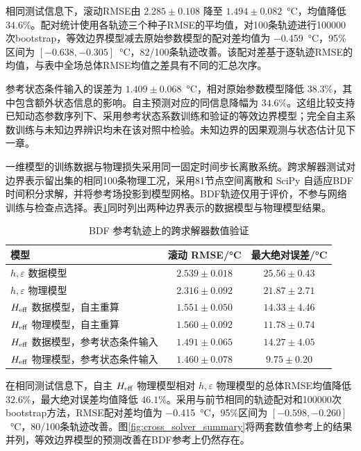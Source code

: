 相同测试信息下，滚动RMSE由 $2.285\pm0.108$ 降至 $1.494\pm0.082$~\si{\degreeCelsius}，均值降低 $34.6\%$。配对统计使用各轨迹三个种子RMSE的平均值，对100条轨迹进行100000次bootstrap，等效边界模型减去原始参数模型的配对差均值为 \SI{-0.459}{\degreeCelsius}，95\%区间为 $[-0.638,-0.305]$~\si{\degreeCelsius}，82/100条轨迹改善。该配对差基于逐轨迹RMSE的均值，与表中全场总体RMSE均值之差具有不同的汇总次序。

参考状态条件输入的误差为 $1.409\pm0.068$~\si{\degreeCelsius}，相对原始参数模型降低 $38.3\%$，其中包含额外状态信息的影响。自主预测对应的同信息降幅为 $34.6\%$。这组比较支持已知动态参数序列下、采用参考状态系数训练和验证的等效边界模型；完全自主系数训练与未知边界辨识均未在该对照中检验。未知边界的因果观测与状态估计见下一章。



一维模型的训练数据与物理损失采用同一固定时间步长离散系统。跨求解器测试对边界表示留出集的相同100条物理工况，采用81节点空间离散和 SciPy 自适应BDF时间积分求解，并将参考场投影到模型网格。BDF轨迹仅用于评价，不参与网络训练与检查点选择。表\ref{tab:cross_solver}同时列出两种边界表示的数据模型与物理模型结果。

\begin{table}[H]
  \centering
  \caption{BDF 参考轨迹上的跨求解器数值验证}
  \label{tab:cross_solver}
  \begin{tabular}{lcc}
    \toprule
    模型 & 滚动 RMSE/\si{\degreeCelsius} & 最大绝对误差/\si{\degreeCelsius} \\
    \midrule
    $h,\varepsilon$ 数据模型 & $2.539\pm0.018$ & $25.56\pm0.43$ \\
    $h,\varepsilon$ 物理模型 & $2.316\pm0.092$ & $21.87\pm2.71$ \\
    ${H_{\mathrm{eff}}}$ 数据模型，自主重算 & $1.551\pm0.050$ & $14.33\pm4.46$ \\
    ${H_{\mathrm{eff}}}$ 物理模型，自主重算 & $1.560\pm0.092$ & $11.78\pm0.74$ \\
    ${H_{\mathrm{eff}}}$ 数据模型，参考状态条件输入 & $1.491\pm0.065$ & $14.27\pm4.05$ \\
    ${H_{\mathrm{eff}}}$ 物理模型，参考状态条件输入 & $1.460\pm0.078$ & $9.75\pm0.20$ \\
    \bottomrule
  \end{tabular}
\end{table}

在相同测试信息下，自主 ${H_{\mathrm{eff}}}$ 物理模型相对 $h,\varepsilon$ 物理模型的总体RMSE均值降低 $32.6\%$，最大绝对误差均值降低 $46.1\%$。采用与前节相同的轨迹配对和100000次bootstrap方法，RMSE配对差均值为 \SI{-0.415}{\degreeCelsius}，95\%区间为 $[-0.598,-0.260]$~\si{\degreeCelsius}，80/100条轨迹改善。图\ref{fig:cross_solver_summary}将两套数值参考上的结果并列，等效边界模型的预测改善在BDF参考上仍然存在。

